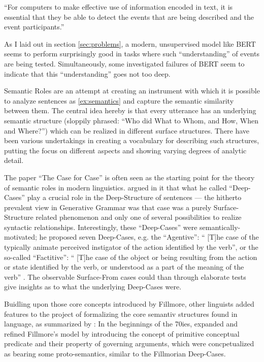 ``For computers to make effective use of information encoded in text, it is essential that
they be able to detect the events that are being described and the event participants.''
\citep{palmer2010semantic}

As I laid out in section \ref{sec:problems}, a modern, unsupervised model
like BERT seems to perform surprisingly good in tasks where such ``understanding'' of
events are being tested.
Simultaneously, some investigated failures of BERT seem to indicate that this ``understanding''
goes not too deep.

Semantic Roles are an attempt at creating an instrument with which it is possible to analyze
sentences as \ref{ex:semantics} and capture the semantic similarity between them. The central
idea hereby is that every utterance has an underlying semantic structure (sloppily phrased: ``Who did What to Whom, and How, When and Where?'') which
can be realized in different surface structures. There have been various undertakings in
creating a vocabulary for describing such structures, putting the focus on different aspects
and showing varying degrees of {\color{red} analytic detail}.

The paper ``The Case for Case'' \citep{fillmore1967case} is often seen as the starting point for
the theory of semantic roles in modern linguistics. \citeauthor{fillmore1967case} argued in it
that what he called ``Deep-Cases'' play a crucial role in the Deep-Structure of sentences ---
the hitherto prevalent view in Generative Grammar was that case was a purely Surface-Structure
related phenomenon and only one of several possibilities to realize syntactic relationships.
Interestingly, these ``Deep-Cases'' were semantically-motivated; he proposed
seven Deep-Cases, e.g. the ``Agentive'': `` [T]he case of the typically animate perceived instigator of the
action identified by the verb'', or the so-called ``Factitive'': `` [T]he case of the object or being resulting from the action or
state identified by the verb, or understood as a part of the meaning of the verb'' \citep[p.~46]{fillmore1967case}.
The observable Surface-From cases could than through elaborate tests give insights as to what the
underlying Deep-Cases were.

Buidling upon those core concepts introduced by Fillmore, other linguists added features
to the project of formalizing the core semantiv structures found in language, as summarized by
\citeauthor{palmer2010semantic}:
In the beginnings of the 70ies, \cite{jackendoff1972semantic} expanded and refined Fillmore's
model by introducing the concept of primitive conceptual predicate and their property of governing
arguments, which were concpetualized as bearing some proto-semantics, similar to the Fillmorian
Deep-Cases.


